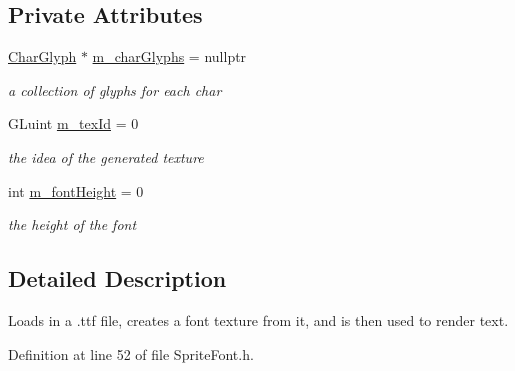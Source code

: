 \subsection*{Private Attributes}
\begin{DoxyCompactItemize}
\item 
\mbox{\label{classnta_1_1SpriteFont_a2fa17cff4bb7bd5125a01dcfa9b0fa88}} 
\hyperlink{namespacenta_d4/d26/structnta_1_1CharGlyph}{Char\+Glyph} $\ast$ \hyperlink{classnta_1_1SpriteFont_a2fa17cff4bb7bd5125a01dcfa9b0fa88}{m\+\_\+char\+Glyphs} = nullptr
\begin{DoxyCompactList}\small\item\em a collection of glyphs for each char \end{DoxyCompactList}\item 
\mbox{\label{classnta_1_1SpriteFont_ab74d460c526a4df82d206bba945fd711}} 
G\+Luint \hyperlink{classnta_1_1SpriteFont_ab74d460c526a4df82d206bba945fd711}{m\+\_\+tex\+Id} = 0
\begin{DoxyCompactList}\small\item\em the idea of the generated texture \end{DoxyCompactList}\item 
\mbox{\label{classnta_1_1SpriteFont_a689c80716d73871ea0d9abe08af9e8dc}} 
int \hyperlink{classnta_1_1SpriteFont_a689c80716d73871ea0d9abe08af9e8dc}{m\+\_\+font\+Height} = 0
\begin{DoxyCompactList}\small\item\em the height of the font \end{DoxyCompactList}\end{DoxyCompactItemize}


\subsection{Detailed Description}
Loads in a .ttf file, creates a font texture from it, and is then used to render text. 

Definition at line 52 of file Sprite\+Font.\+h.



